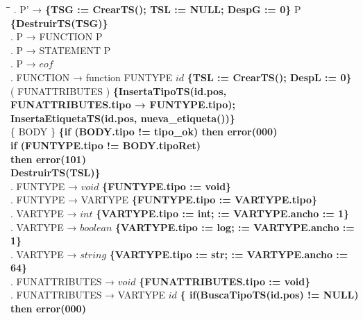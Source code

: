 \begin{tabbing}
    \hspace{1cm}\=\hspace{4.5cm}\=\hspace{2cm}\=\hspace{1cm}\=\hspace{1cm}\=\kill
    . P' → \textbf{\{TSG := CrearTS(); TSL := NULL; DespG := 0\}} P \textbf{\{DestruirTS(TSG)\}}\\
    . P → FUNCTION P\\
    . P → STATEMENT P\\
    . P → $eof$\\
    . FUNCTION → function FUNTYPE $id$ \textbf{\{TSL := CrearTS(); DespL := 0\}} \\
    \>              \>( FUNATTRIBUTES ) \textbf{\{InsertaTipoTS(id.pos, }\\
    \>              \> \textbf{FUNATTRIBUTES.tipo → FUNTYPE.tipo);}\\
    \>           \>\textbf{InsertaEtiquetaTS(id.pos, nueva\_etiqueta())\}}\\
    \>              \>\{ BODY \}\> \textbf{\{if (BODY.tipo != tipo\_ok) then error(000) }\\
    \>              \>          \> \textbf{ if (FUNTYPE.tipo != BODY.tipoRet)}\\
    \>              \>          \>             \>   \textbf{then error(101)}\\
    \>              \>          \> \textbf{DestruirTS(TSL)\}}\\
    . FUNTYPE → $void$ \textbf{\{FUNTYPE.tipo := void\}}\\
    . FUNTYPE → VARTYPE \textbf{\{FUNTYPE.tipo := VARTYPE.tipo\}}\\
    . VARTYPE → $int$ \textbf{\{VARTYPE.tipo := int; := VARTYPE.ancho := 1\}}\\
    . VARTYPE → $boolean$ \textbf{\{VARTYPE.tipo := log; := VARTYPE.ancho := 1\}}\\
    . VARTYPE → $string$ \textbf{\{VARTYPE.tipo := str; := VARTYPE.ancho := 64\}}\\
    . FUNATTRIBUTES → $void$ \textbf{\{FUNATTRIBUTES.tipo := void\}}\\
    . FUNATTRIBUTES → \>VARTYPE $id$ \textbf{\{
    if(BuscaTipoTS(id.pos) != NULL)} \\
    \>              \>          \>
    \>\textbf{then error(000)}\\
    \>              \>          \>

\end{tabbing}
